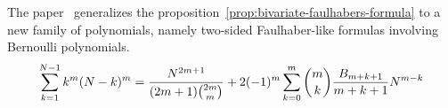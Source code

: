 The paper~\cite{barbero2020two} generalizes the proposition~\eqref{prop:bivariate-faulhabers-formula} to a new family
of polynomials, namely two-sided Faulhaber-like formulas involving Bernoulli polynomials.
\begin{align*}
    \sum_{k=1}^{N-1} k^{m} (N-k)^m
    = \frac{N^{2m+1}}{(2m+1) \binom{2m}{m}} + 2 (-1)^{m} \sum_{k=0}^{m} \binom{m}{k} \frac{{B}\sb{m+k+1}}{m+k+1} N^{m-k}
\end{align*}
